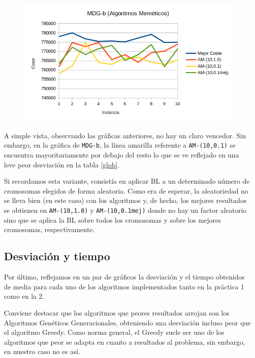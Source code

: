 \begin{figure}[H]
	\centering
	\includegraphics[scale=0.6]{img/amb.png}
\end{figure}



A simple vista, observando las gráficas anteriores, no hay un claro vencedor. Sin embargo, en la gráfica de \texttt{MDG-b}, la línea amarilla referente a \texttt{AM-(10,0.1)} se encuentra mayoritariamente por debajo del resto lo que se ve reflejado en una leve peor desviación en la tabla \ref{glob}.

Si recordamos esta variante, consistía en aplicar BL a un determinado número de cromosomas elegidos de forma aleatoria. Como era de esperar, la aleatoriedad no se lleva bien (en este caso) con los algoritmos y, de hecho, los mejores resultados se obtienen en \texttt{AM-(10,1.0)} y \texttt{AM-(10,0.1mej)} donde no hay un factor aleatorio sino que se aplica la BL sobre todos los cromosomas y sobre los mejores cromosomas, respectivamente.



\newpage 
\subsection{Desviación y tiempo}
Por último, reflejamos en un par de gráficos la desviación y el tiempo obtenidos de media para cada uno de los algoritmos implementados tanto en la práctica 1 como en la 2.

Conviene destacar que los algoritmos que peores resultados arrojan son los Algoritmos Genéticos Generacionales, obteniendo una desviación incluso peor que el algoritmo Greedy. Como norma general, el Greedy suele ser uno de los algoritmos que peor se adapta en cuanto a resultados al problema, sin embargo, en nuestro caso no es así.





